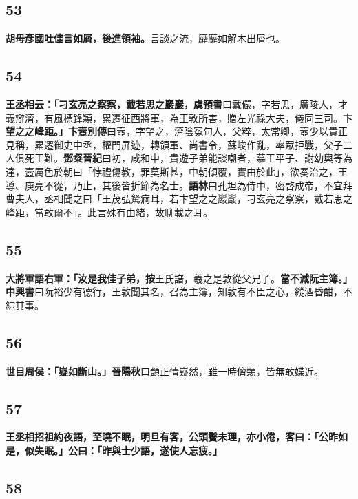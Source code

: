 \subsection*{53}

\textbf{胡毋彥國吐佳言如屑，後進領袖。}{\footnotesize 言談之流，靡靡如解木出屑也。}

\subsection*{54}

\textbf{王丞相云：「刁玄亮之察察，戴若思之巖巖，}{\footnotesize \textbf{虞預書}曰戴儼，字若思，廣陵人，才義辯濟，有風標鋒穎，累遷征西將軍，為王敦所害，贈左光祿大夫，儀同三司。}\textbf{卞望之之峰距。」}{\footnotesize \textbf{卞壼別傳}曰壼，字望之，濟陰冤句人，父粹，太常卿，壼少以貴正見稱，累遷御史中丞，權門屏迹，轉領軍、尚書令，蘇峻作亂，率眾拒戰，父子二人俱死王難。\textbf{鄧粲晉紀}曰初，咸和中，貴遊子弟能談嘲者，慕王平子、謝幼輿等為達，壼厲色於朝曰「悖禮傷教，罪莫斯甚，中朝傾覆，實由於此」，欲奏治之，王導、庾亮不從，乃止，其後皆折節為名士。\textbf{語林}曰孔坦為侍中，密啓成帝，不宜拜曹夫人，丞相聞之曰「王茂弘駑痾耳，若卞望之之巖巖，刁玄亮之察察，戴若思之峰距，當敢爾不」。此言殊有由緒，故聊載之耳。}

\subsection*{55}

\textbf{大將軍語右軍：「汝是我佳子弟，}{\footnotesize \textbf{按}王氏譜，羲之是敦從父兄子。}\textbf{當不減阮主簿。」}{\footnotesize \textbf{中興書}曰阮裕少有德行，王敦聞其名，召為主簿，知敦有不臣之心，縱酒昏酣，不綜其事。}

\subsection*{56}

\textbf{世目周侯：「嶷如斷山。」}{\footnotesize \textbf{晉陽秋}曰顗正情嶷然，雖一時儕類，皆無敢媟近。}

\subsection*{57}

\textbf{王丞相招祖約夜語，至曉不眠，明旦有客，公頭鬢未理，亦小倦，客曰：「公昨如是，似失眠。」公曰：「昨與士少語，遂使人忘疲。」}

\subsection*{58}

